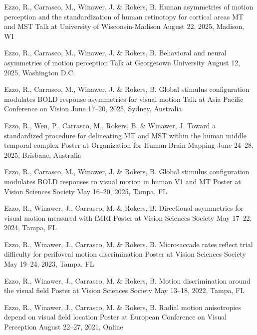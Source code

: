\begin{cventries}
  \cventry
    {Ezzo, R., Carrasco, M., Winawer, J. \& Rokers, B.}
    {Human asymmetries of motion perception and the standardization of human retinotopy for cortical areas MT and MST}
    {Talk at University of Wisconsin-Madison}
    {August 22, 2025, Madison, WI}
    {}

  \cventry
    {Ezzo, R., Carrasco, M., Winawer, J. \& Rokers, B.}
    {Behavioral and neural asymmetries of motion perception}
    {Talk at Georgetown University}
    {August 12, 2025, Washington D.C.}
    {}
    
  \cventry
    {Ezzo, R., Carrasco, M., Winawer, J. \& Rokers, B.}
    {Global stimulus configuration modulates BOLD response asymmetries for visual motion}
    {Talk at Asia Pacific Conference on Vision}
    {June 17–20, 2025, Sydney, Australia}
    {}

  \cventry
    {Ezzo, R., Wen, P., Carrasco, M., Rokers, B. \& Winawer, J.}
    {Toward a standardized procedure for delineating MT and MST within the human middle temporal complex}
    {Poster at Organization for Human Brain Mapping}
    {June 24–28, 2025, Brisbane, Australia}
    {}

  \cventry
    {Ezzo, R., Carrasco, M., Winawer, J. \& Rokers, B.}
    {Global stimulus configuration modulates BOLD responses to visual motion in human V1 and MT}
    {Poster at Vision Sciences Society}
    {May 16–20, 2025, Tampa, FL}
    {}

  \cventry
    {Ezzo, R., Winawer, J., Carrasco, M. \& Rokers, B.}
    {Directional asymmetries for visual motion measured with fMRI}
    {Poster at Vision Sciences Society}
    {May 17–22, 2024, Tampa, FL}
    {}

  \cventry
    {Ezzo, R., Winawer, J., Carrasco, M. \& Rokers, B.}
    {Microsaccade rates reflect trial difficulty for perifoveal motion discrimination}
    {Poster at Vision Sciences Society}
    {May 19–24, 2023, Tampa, FL}
    {}

  \cventry
    {Ezzo, R., Winawer, J., Carrasco, M. \& Rokers, B.}
    {Motion discrimination around the visual field}
    {Poster at Vision Sciences Society}
    {May 13–18, 2022, Tampa, FL}
    {}

  \cventry
    {Ezzo, R., Winawer, J., Carrasco, M. \& Rokers, B.}
    {Radial motion anisotropies depend on visual field location}
    {Poster at European Conference on Visual Perception}
    {August 22–27, 2021, Online}
    {}
\end{cventries}
